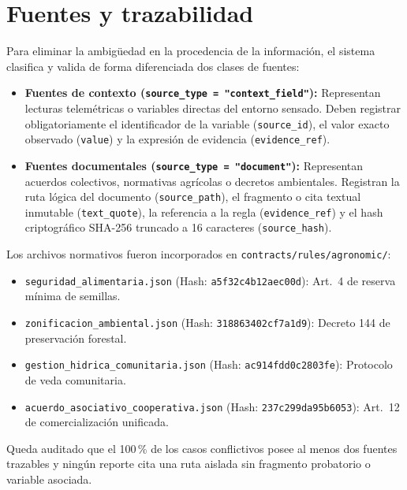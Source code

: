 \documentclass[11pt,a4paper]{article}
\begin{document}
\section{Fuentes y trazabilidad}
Para eliminar la ambigüedad en la procedencia de la información, el sistema clasifica y valida de forma diferenciada dos clases de fuentes:

\begin{itemize}[leftmargin=*]
    \item \textbf{Fuentes de contexto (\texttt{source\_type = "context\_field"}):} Representan lecturas telemétricas o variables directas del entorno sensado. Deben registrar obligatoriamente el identificador de la variable (\texttt{source\_id}), el valor exacto observado (\texttt{value}) y la expresión de evidencia (\texttt{evidence\_ref}).
    \item \textbf{Fuentes documentales (\texttt{source\_type = "document"}):} Representan acuerdos colectivos, normativas agrícolas o decretos ambientales. Registran la ruta lógica del documento (\texttt{source\_path}), el fragmento o cita textual inmutable (\texttt{text\_quote}), la referencia a la regla (\texttt{evidence\_ref}) y el hash criptográfico SHA-256 truncado a 16 caracteres (\texttt{source\_hash}).
\end{itemize}

Los archivos normativos fueron incorporados en \texttt{contracts/rules/agronomic/}:
\begin{itemize}
    \item \texttt{seguridad\_alimentaria.json} (Hash: \texttt{a5f32c4b12aec00d}): Art.~4 de reserva mínima de semillas.
    \item \texttt{zonificacion\_ambiental.json} (Hash: \texttt{318863402cf7a1d9}): Decreto 144 de preservación forestal.
    \item \texttt{gestion\_hidrica\_comunitaria.json} (Hash: \texttt{ac914fdd0c2803fe}): Protocolo de veda comunitaria.
    \item \texttt{acuerdo\_asociativo\_cooperativa.json} (Hash: \texttt{237c299da95b6053}): Art.~12 de comercialización unificada.
\end{itemize}

Queda auditado que el 100\,\% de los casos conflictivos posee al menos dos fuentes trazables y ningún reporte cita una ruta aislada sin fragmento probatorio o variable asociada.

\end{document}
